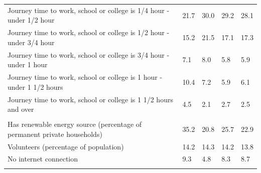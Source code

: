 \documentclass{article}
\begin{document}
\begin{table}[h]
\begin{tabular}{KTTTT}
Journey time to work, school or college is 1/4 hour - under 1/2 hour & 21.7& 30.0& 29.2& 28.1\\
Journey time to work, school or college is 1/2 hour - under 3/4 hour & 15.2& 21.5& 17.1& 17.3\\
Journey time to work, school or college is 3/4 hour - under 1 hour & 7.1& 8.0& 5.8& 5.9\\
Journey time to work, school or college is 1 hour - under 1 1/2 hours & 10.4&  7.2&  5.9&  6.1\\
Journey time to work, school or college is 1 1/2 hours and over & 4.5& 2.1& 2.7& 2.5\\
\hline
    \\ 
    \hline
Has renewable energy source (percentage of permanent private households) & 35.2& 20.8& 25.7& 22.9\\
    \hline
Volunteers (percentage of population) & 14.2& 14.3& 14.2& 13.8\\
    \hline
No internet connection& 9.3& 4.8& 8.3& 8.7\\
\hline
\end{tabular}
\end{table}
\end{document}
